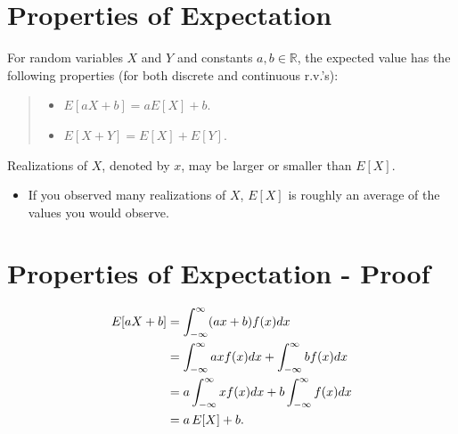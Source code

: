\documentclass[letterpaper,10pt,english]{sphinxmanual}
\begin{document}
\section{Properties of Expectation}
\label{probability:properties-of-expectation}
For random variables $X$ and $Y$ and constants $a,b
\in \mathbb{R}$, the expected value has the following properties (for
both discrete and continuous r.v.'s):
\begin{quote}
\begin{itemize}
\item {} 
$E[aX + b] = aE[X] + b.$

\end{itemize}
\begin{itemize}
\item {} 
$E[X + Y] = E[X] + E[Y].$

\end{itemize}
\end{quote}

Realizations of $X$, denoted by $x$, may be larger or
smaller than $E[X]$.
\begin{itemize}
\item {} 
If you observed many realizations of $X$, $E[X]$ is
roughly an average of the values you would observe.

\end{itemize}


\section{Properties of Expectation - Proof}
\label{probability:properties-of-expectation-proof}\begin{gather}
\begin{split}E[aX + b] & = \int_{-\infty}^{\infty} (ax+b)f(x) dx \\
& = \int_{-\infty}^{\infty} a x f(x) dx +
\int_{-\infty}^{\infty} b f(x) dx \\
& = a \int_{-\infty}^{\infty} x f(x) dx + b
\int_{-\infty}^{\infty} f(x) dx \\
& = a\,E[X] + b.\end{split}\notag
\end{gather}
\end{document}
